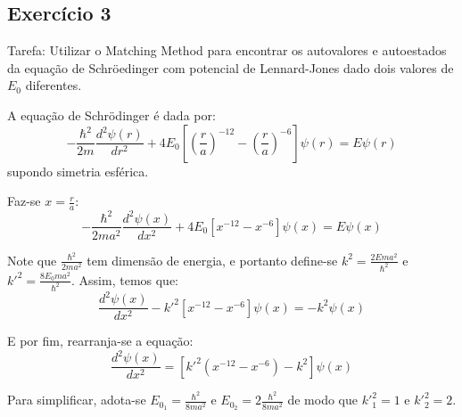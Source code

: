 \documentclass[12pt, a4paper]{article} %
\begin{document}
        \subsection{Exerc\'icio 3}

            Tarefa: Utilizar o Matching Method para encontrar os autovalores e autoestados da equa\c{c}\~ao de Schr\"oedinger com potencial de Lennard-Jones dado dois valores de $E_{0}$ diferentes.

            A equa\c{c}\~ao de Schr\"odinger \'e dada por:
            \begin{equation*}
                -\frac{\hbar^{2}}{2m} \frac{d^{2}\psi(r)}{dr^{2}} + 4E_{0} \left[ \left( \frac{r}{a} \right)^{-12} - \left( \frac{r}{a} \right)^{-6} \right]\psi(r) = E\psi(r)
            \end{equation*}
            supondo simetria esf\'erica.

            Faz-se $x = \frac{r}{a}$:
            \begin{equation*}
                -\frac{\hbar^{2}}{2ma^2} \frac{d^{2}\psi(x)}{dx^{2}} + 4E_{0} \left[ x^{-12} - x^{-6} \right]\psi(x) = E\psi(x)
            \end{equation*}

            Note que $\frac{\hbar^{2}}{2ma^2}$ tem dimens\~ao de energia, e portanto define-se $k^2 = \frac{2Ema^2}{\hbar^{2}}$ e $k'^2 = \frac{8E_{0}ma^2}{\hbar^{2}}$. Assim, temos que:
            \begin{equation*}
                \frac{d^{2}\psi(x)}{dx^{2}} - k'^2\left[  x^{-12} - x^{-6} \right]\psi(x) = -k^2\psi(x)
            \end{equation*}

            E por fim, rearranja-se a equa\c{c}\~ao:
            \begin{equation*}
                \frac{d^{2}\psi(x)}{dx^{2}} = \left[k'^2\left( x^{-12} - x^{-6} \right) -k^2\right]\psi(x)
            \end{equation*}

            Para simplificar, adota-se $E_{0_{1}} = \frac{\hbar^{2}}{8ma^2}$ e $E_{0_{2}} = 2\frac{\hbar^{2}}{8ma^2}$ de modo que $k'^2_{1} = 1$ e $k'^2_{2} = 2$.

              
\end{document}
